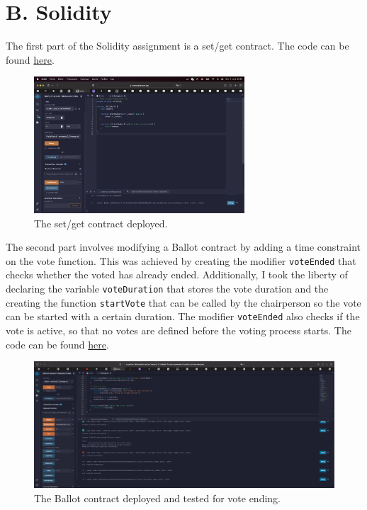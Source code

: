 \documentclass{article}
\begin{document}
\newpage

\section*{B. Solidity}

The first part of the Solidity assignment is a set/get contract. The code can be found \href{https://github.com/dbsc/zku/blob/main/background_assignment/helloworld.sol}{here}.

\begin{figure}[h]
    \centering
    \includegraphics[width=0.7\textwidth]{screenshots/number.png}
    \caption*{The set/get contract deployed.}
\end{figure}

The second part involves modifying a Ballot contract by adding a time constraint on the vote function. This was achieved by creating the modifier \texttt{voteEnded} that checks whether the voted has already ended. Additionally, I took the liberty of declaring the variable \texttt{voteDuration} that stores the vote duration and the creating the function \texttt{startVote} that can be called by the chairperson so the vote can be started with a certain duration. The modifier \texttt{voteEnded} also checks if the vote is active, so that no votes are defined before the voting process starts. The code can be found \href{https://github.com/dbsc/zku/blob/main/background_assignment/voting.sol}{here}.

\begin{figure}[h]
    \centering
    \includegraphics[width=\textwidth]{screenshots/ballot.png}
    \caption*{The Ballot contract deployed and tested for vote ending.}
\end{figure}
\end{document}
